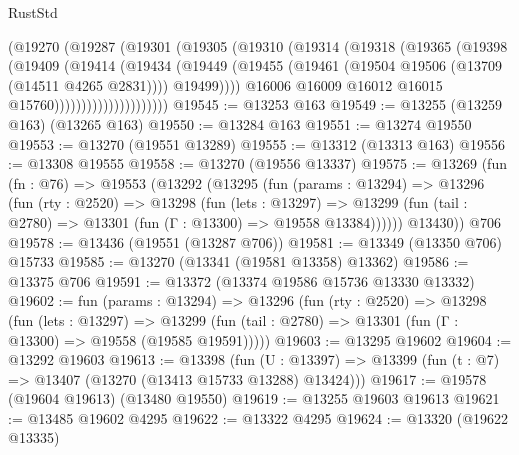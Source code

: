 \begin{lexlean}{RustStd}
\begin{coremodule}
                          (@19270
                            (@19287
                              (@19301
                                (@19305
                                  (@19310
                                    (@19314
                                      (@19318
                                        (@19365
                                          (@19398
                                            (@19409
                                              (@19414
                                                (@19434
                                                  (@19449
                                                    (@19455
                                                      (@19461
                                                        (@19504
                                                          @19506
                                                          (@13709 (@14511 @4265 @2831))))
                                                      @19499))))
                                              @16006
                                              @16009
                                              @16012
                                              @16015
                                              @15760)))))))))))))))))))))
@19545 := @13253 @163
@19549 := @13255 (@13259 @163) (@13265 @163)
@19550 := @13284 @163
@19551 := @13274 @19550
@19553 := @13270 (@19551 @13289)
@19555 := @13312 (@13313 @163)
@19556 := @13308 @19555
@19558 := @13270 (@19556 @13337)
@19575 := @13269
    (fun (fn : @76) =>
    @19553
      (@13292
        (@13295
          (fun (params : @13294) =>
          @13296
            (fun (rty : @2520) =>
            @13298
              (fun (lets : @13297) =>
              @13299 (fun (tail : @2780) => @13301 (fun (Γ : @13300) => @19558 @13384))))))
        @13430))
    @706
@19578 := @13436 (@19551 (@13287 @706))
@19581 := @13349 (@13350 @706) @15733
@19585 := @13270 (@13341 (@19581 @13358) @13362)
@19586 := @13375 @706
@19591 := @13372 (@13374 @19586 @15736 @13330 @13332)
@19602 := fun (params : @13294) =>
  @13296
    (fun (rty : @2520) =>
    @13298
      (fun (lets : @13297) =>
      @13299 (fun (tail : @2780) => @13301 (fun (Γ : @13300) => @19558 (@19585 @19591)))))
@19603 := @13295 @19602
@19604 := @13292 @19603
@19613 := @13398
    (fun (U : @13397) => @13399 (fun (t : @7) => @13407 (@13270 (@13413 @15733 @13288) @13424)))
@19617 := @19578 (@19604 @19613) (@13480 @19550)
@19619 := @13255 @19603 @19613
@19621 := @13485 @19602 @4295
@19622 := @13322 @4295
@19624 := @13320 (@19622 @13335)

\end{coremodule}
\end{lexlean}
